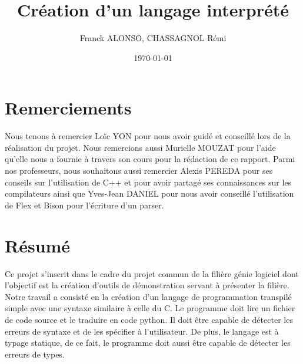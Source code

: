 \documentclass[a4paper]{article}%
\title{Création d'un langage interprété}
\author{Franck ALONSO, CHASSAGNOL Rémi}
\date{\today}
\begin{document}

\clearpage{}

\thispagestyle{empty}
\tableofcontents
\clearpage{}

\section*{Remerciements}
\thispagestyle{empty}

\doublespacing
\large

Nous tenons à remercier Loïc YON pour nous avoir guidé et conseillé lors de la
réalisation du projet. Nous remercions aussi Murielle MOUZAT pour l'aide qu'elle
nous a fournie à travers son cours pour la rédaction de ce rapport. Parmi nos
professeurs, nous souhaitons aussi remercier Alexis PEREDA pour ses conseils sur
l'utilisation de C++ et pour avoir partagé ses connaissances sur les
compilateurs ainsi que Yves-Jean DANIEL pour nous avoir conseillé l'utilisation
de Flex et Bison pour l'écriture d'un \gls{parser}.

\normalsize
\onehalfspacing

\clearpage{}

\listoffigures
\clearpage{}


\section*{Résumé}

Ce projet s'inscrit dans le cadre du projet commun de la filière génie logiciel
dont l'objectif est la création d'outils de démonstration servant à présenter la
filière. Notre travail a consisté en la création d'un langage de programmation
transpilé simple avec une syntaxe similaire à celle du C. Le programme doit lire
un fichier de code source et le traduire en code python. Il doit être capable
de détecter les erreurs de syntaxe et de les spécifier à l'utilisateur. De
plus, le langage est à typage statique, de ce fait, le programme doit aussi être
capable de détecter les erreurs de types.\\
\end{document}
